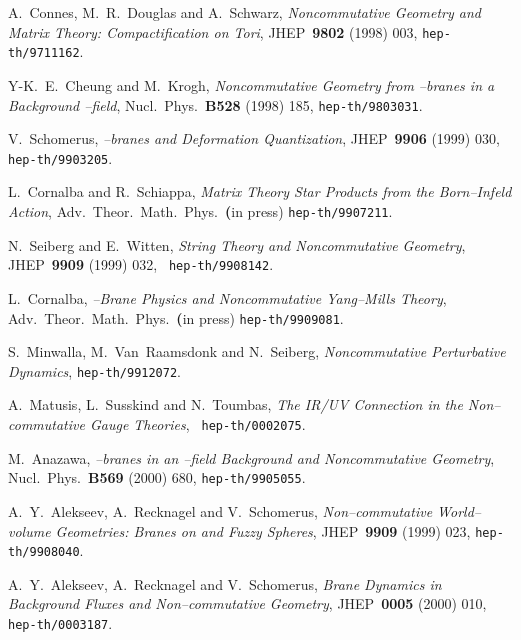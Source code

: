 \documentclass[a4paper,11pt]{article}
\begin{document}
\begin{thebibliography}{99}

\small{
    
  {\small A.~Connes, M.~R.~Douglas and A.~Schwarz, \textit{
Noncommutative Geometry and Matrix Theory: Compactification on Tori}, JHEP\ 
\textbf{9802} (1998) 003, \texttt{hep-th/9711162}. }

  {\small Y-K.~E.~Cheung and M.~Krogh, \textit{
Noncommutative Geometry from \myHighlight{$D0$}\coordHE{}--branes in a Background \coordHE{}--field},
Nucl.\ Phys.\ \textbf{B528} (1998) 185, \texttt{hep-th/9803031}. }

  {\small V.~Schomerus, \textit{\coordHE{}--branes and
Deformation Quantization}, JHEP\ \textbf{9906} (1999) 030, \texttt{
hep-th/9903205}. }

  {\small L.~Cornalba and R.~Schiappa, \textit{
Matrix Theory Star Products from the Born--Infeld Action}, Adv.\ Theor.\
Math.\ Phys.\ \textbf{(}in press) \texttt{hep-th/9907211}. }

  {\small N.~Seiberg and E.~Witten, \textit{String
Theory and Noncommutative Geometry}, JHEP\ \textbf{9909} (1999) 032, \texttt{
hep-th/9908142}. }

  {\small L.~Cornalba, \textit{\coordHE{}--Brane Physics and
Noncommutative Yang--Mills Theory}, Adv.\ Theor.\ Math.\ Phys.\ \textbf{(}in
press) \texttt{hep-th/9909081}. }

  {\small S.~Minwalla, M.~Van~Raamsdonk and N.~Seiberg, \textit{
Noncommutative Perturbative Dynamics}, \texttt{hep-th/9912072}. }

\bibitem{MST}  {\small A.~Matusis, L.~Susskind and N.~Toumbas, \textit{The
IR/UV Connection in the Non--commutative Gauge Theories}, \texttt{
hep-th/0002075}. }

  {\small M.~Anazawa, \textit{\coordHE{}--branes in an
\coordHE{}--field Background and Noncommutative Geometry}, Nucl.\ Phys.\
\textbf{B569} (2000) 680, \texttt{hep-th/9905055}. }

\bibitem{ARS-1}  {\small A.~Y.~Alekseev, A.~Recknagel and V.~Schomerus, 
\textit{Non--commutative World--volume Geometries: Branes on \coordHE{} and
Fuzzy Spheres}, JHEP\ \textbf{9909} (1999) 023, \texttt{hep-th/9908040}. }

\bibitem{ARS-2}  {\small A.~Y.~Alekseev, A.~Recknagel and V.~Schomerus, 
\textit{Brane Dynamics in Background Fluxes and Non--commutative Geometry},
JHEP\ \textbf{0005} (2000) 010, \texttt{hep-th/0003187}. }

}
\end{thebibliography}
\end{document}
